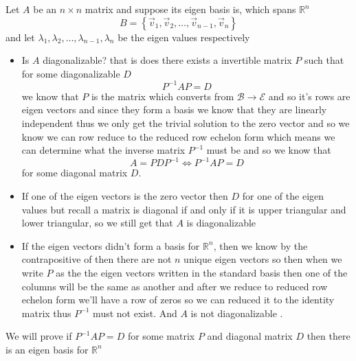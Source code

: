 \documentclass[11pt]{book}
\begin{document}
\begin{eg}
    Let $A$ be an $n\times n$ matrix and suppose its eigen basis is, which spans $\mathbb{R} ^{n} $ 
    \[
    B= \left\{ \vec{v} _{1} , \vec{v} _{2} , \dotsc  , \vec{v} _{n - 1} , \vec{v} _{n}  \right\} 
    \]
    and let $\lambda _{1} , \lambda _{2} , \dotsc  , \lambda _{n - 1} , \lambda _{n} $ be the eigen values respectively 
    \begin{itemize}
        \item Is $A$ diagonalizable? that is does there exists a invertible matrix $P$ such that for some diagonalizable $D$ 
            \[
            P^{-1} AP= D
            \]
            we know that $P$ is the matrix which converts from $\mathcal{B} \to \mathcal{E} $ and so it's rows are eigen vectors and since they form a basis we know that they are linearly independent thus we only get the trivial solution to the zero vector and so we know we can row reduce to the reduced row echelon form which means we can determine what the inverse matrix $P^{-1} $ must be and so we know that 
            \[
            A = PDP^{-1} \Leftrightarrow P^{-1} AP = D 
            \]
            for some diagonal matrix $D$. 
        \item If one of the eigen vectors is the zero vector then $D$ for one of the eigen values but recall a matrix is diagonal if and only if it is upper triangular and lower triangular, so we still get that $A$ is diagonalizable 
        \item If the eigen vectors didn't form a basis for $\mathbb{R} ^{n} $, then we know by the contrapositive of then there are not $n$ unique eigen vectors so then when we write $P$ as the the eigen vectors written in the standard basis then one of the columns will be the same as another and after we reduce to reduced row echelon form we'll have a row of zeros so we can reduced it to the identity matrix thus $P^{-1} $ must not exist. And $A$ is not diagonalizable .
    \end{itemize}
\end{eg}

We will prove if $P^{-1} AP= D$ for some matrix $P$ and diagonal matrix $D$ then there is an eigen basis for $\mathbb{R} ^{n} $ 
\end{document}
